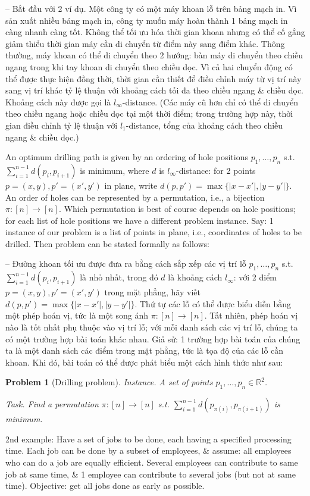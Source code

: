 \documentclass{article}
\newtheorem{problem}{Problem}
\begin{document}
\begin{itemize}
    -- Bắt đầu với 2 ví dụ. Một công ty có một máy khoan lỗ trên bảng mạch in. Vì sản xuất nhiều bảng mạch in, công ty muốn máy hoàn thành 1 bảng mạch in càng nhanh càng tốt. Không thể tối ưu hóa thời gian khoan nhưng có thể cố gắng giảm thiểu thời gian máy cần di chuyển từ điểm này sang điểm khác. Thông thường, máy khoan có thể di chuyển theo 2 hướng: bàn máy di chuyển theo chiều ngang trong khi tay khoan di chuyển theo chiều dọc. Vì cả hai chuyển động có thể được thực hiện đồng thời, thời gian cần thiết để điều chỉnh máy từ vị trí này sang vị trí khác tỷ lệ thuận với khoảng cách tối đa theo chiều ngang \& chiều dọc. Khoảng cách này được gọi là $l_\infty$-distance. (Các máy cũ hơn chỉ có thể di chuyển theo chiều ngang hoặc chiều dọc tại một thời điểm; trong trường hợp này, thời gian điều chỉnh tỷ lệ thuận với $l_1$-distance, tổng của khoảng cách theo chiều ngang \& chiều dọc.)

    An optimum drilling path is given by an ordering of hole positions $p_1,\ldots,p_n$ s.t. $\sum_{i=1}^{n-1} d(p_i,p_{i+1})$ is minimum, where $d$ is $l_\infty$-distance: for 2 points $p = (x,y),p' = (x',y')$ in plane, write $d(p,p') = \max\{|x - x'|,|y - y'|\}$. An order of holes can be represented by a permutation, i.e., a bijection $\pi:[n]\to[n]$. Which permutation is best of course depends on hole positions; for each list of hole positions we have a different problem instance. Say: 1 instance of our problem is a list of points in plane, i.e., coordinates of holes to be drilled. Then problem can be stated formally as follows:

    -- Đường khoan tối ưu được đưa ra bằng cách sắp xếp các vị trí lỗ $p_1,\ldots,p_n$ s.t. $\sum_{i=1}^{n-1} d(p_i,p_{i+1})$ là nhỏ nhất, trong đó $d$ là khoảng cách $l_\infty$: với 2 điểm $p = (x,y),p' = (x',y')$ trong mặt phẳng, hãy viết $d(p,p') = \max\{|x - x'|,|y - y'|\}$. Thứ tự các lỗ có thể được biểu diễn bằng một phép hoán vị, tức là một song ánh $\pi:[n]\to[n]$. Tất nhiên, phép hoán vị nào là tốt nhất phụ thuộc vào vị trí lỗ; với mỗi danh sách các vị trí lỗ, chúng ta có một trường hợp bài toán khác nhau. Giả sử: 1 trường hợp bài toán của chúng ta là một danh sách các điểm trong mặt phẳng, tức là tọa độ của các lỗ cần khoan. Khi đó, bài toán có thể được phát biểu một cách hình thức như sau:

    \begin{problem}[Drilling problem]
        \item {\sf Instance.} A set of points $p_1,\ldots,p_n\in\mathbb{R}^2$.
        \item {\sf Task.} Find a permutation $\pi:[n]\to[n]$ s.t. $\sum_{i=1}^{n-1} d(p_{\pi(i)},p_{\pi(i + 1)})$ is minimum.
    \end{problem}
    2nd example: Have a set of jobs to be done, each having a specified processing time. Each job can be done by a subset of employees, \& assume: all employees who can do a job are equally efficient. Several employees can contribute to same job at same time, \& 1 employee can contribute to several jobs (but not at same time). Objective: get all jobs done as early as possible.


\end{itemize}
\end{document}
